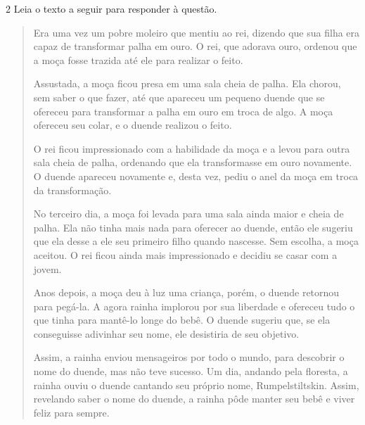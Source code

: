 
\num{2} Leia o texto a seguir para responder à questão.

\begin{quote}
Era uma vez um pobre moleiro que mentiu ao rei, dizendo que sua filha
era capaz de transformar palha em ouro. O rei, que adorava ouro, ordenou
que a moça fosse trazida até ele para realizar o feito.

Assustada, a moça ficou presa em uma sala cheia de palha. Ela chorou,
sem saber o que fazer, até que apareceu um pequeno duende que se
ofereceu para transformar a palha em ouro em troca de algo. A moça
ofereceu seu colar, e o duende realizou o feito.

O rei ficou impressionado com a habilidade da moça e a levou para outra
sala cheia de palha, ordenando que ela transformasse em ouro novamente.
O duende apareceu novamente e, desta vez, pediu o anel da moça em troca
da transformação.

No terceiro dia, a moça foi levada para uma sala ainda maior e cheia de
palha. Ela não tinha mais nada para oferecer ao duende, então ele
sugeriu que ela desse a ele seu primeiro filho quando nascesse. Sem
escolha, a moça aceitou. O rei ficou ainda mais impressionado e decidiu
se casar com a jovem.

Anos depois, a moça deu à luz uma criança, porém, o duende retornou para
pegá-la. A agora rainha implorou por sua liberdade e ofereceu tudo o que
tinha para mantê-lo longe do bebê. O duende sugeriu que, se ela
conseguisse adivinhar seu nome, ele desistiria de seu objetivo.

Assim, a rainha enviou mensageiros por todo o mundo, para descobrir o
nome do duende, mas não teve sucesso. Um dia, andando pela floresta, a
rainha ouviu o duende cantando seu próprio nome, Rumpelstiltskin. Assim,
revelando saber o nome do duende, a rainha pôde manter seu bebê e viver
feliz para sempre.
\end{quote}

